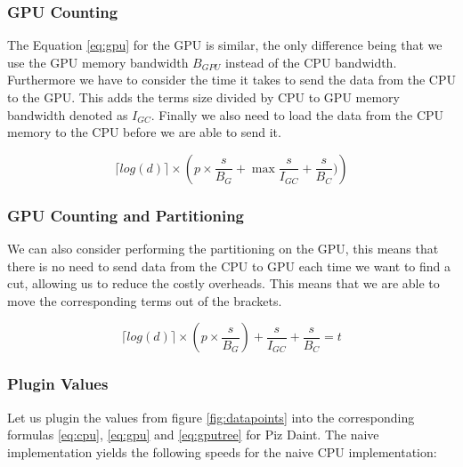 \documentclass[]{article}
\begin{document}
\subsubsection{GPU Counting}


The Equation \ref{eq:gpu} for the GPU is similar, the only difference being that we use the GPU memory bandwidth $B_{GPU}$ instead of the CPU bandwidth. Furthermore we have to consider the time it takes to send the data from the CPU to the GPU. This adds the terms size divided by CPU to GPU memory bandwidth denoted as $I_{GC}$. Finally we also need to load the data from the CPU memory to the CPU before we are able to send it. 

\begin{center}
	\begin{equation}
			\lceil log(d) \rceil \times \left ( p \times \frac{s}{B_{G}} +\max{  \frac{s}{I_{GC}}  + \frac{s}{B_{C}} )} \right )
		\label{eq:gpu}
	\end{equation}
\end{center}


\subsubsection{GPU Counting and Partitioning}\label{gpu-tree-building}

We can also consider performing the partitioning on the GPU, this means that there is no need to send data from the CPU to GPU each time we want to find a cut, allowing us to reduce the costly overheads. This means that we are able to move the corresponding terms out of the brackets. 

\begin{center}
	\begin{equation}
		\lceil log(d) \rceil \times \left ( p \times \frac{s}{B_{G}} \right ) + \frac{s}{I_{GC}} + \frac{s}{B_{C}} = t
		\label{eq:gputree}
	\end{equation}
\end{center}

\newcommand\s{12}

\newcommand\p{32}


\normalfont
\subsubsection{Plugin Values} 

Let us plugin the values from figure \ref{fig:datapoints} into the corresponding formulas \ref{eq:cpu}, \ref{eq:gpu} and \ref{eq:gputree} for Piz Daint.
The naive implementation yields the following speeds for the naive CPU  implementation:
\end{document}
